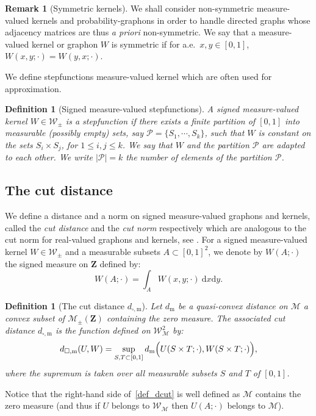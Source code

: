 \documentclass{amsart}
\newcommand{\aE}{a.e.\ }
\theoremstyle{plain}
\newtheorem{defin}[Th]{Definition}
\theoremstyle{definition}
\newtheorem{remark}[Th]{Remark}
\newcommand{\Space}{\mathbf{Z}}
\newcommand{\signed}{\pm}
\newcommand{\cm}{\mathcal{M}}
\newcommand{\cp}{\mathcal{P}}
\newcommand{\cM}{\mathcal{M}}
\newcommand{\cP}{\mathcal{P}}
\newcommand{\SignedMeas}{\mathcal{M}_{\pm}(\Space)}
\newcommand{\Kernel}{\mathcal{W}_{\signed}}
\newcommand{\KernelM}{\mathcal{W}_\cm}
\newcommand{\m}{\mathrm{m}}
\newcommand{\dmeas}{d_\m}
\newcommand{\dcut}{d_{\square,\m}}
\newcommand{\drv}{\mathrm{d}}
\begin{document}
\begin{remark}[Symmetric kernels]
We shall  consider non-symmetric measure-valued kernels and
probability-graphons in order to handle  directed graphs whose
adjacency matrices are thus \emph{a priori} non-symmetric.
We say that a measure-valued kernel or graphon $W$ is symmetric 
if for \aE $x,y \in [0,1]$, $W(x,y;\cdot)=W(y,x;\cdot)$.
\end{remark}

We define stepfunctions  measure-valued kernel which are  often used for
approximation.
 
\begin{defin}[Signed measure-valued stepfunctions]
  \label{def:stepfunction}
  A signed measure-valued kernel $W\in \Kernel$ is a \emph{stepfunction} if there exists a
  finite partition of $[0,1]$ into measurable (possibly empty) sets, say
  $\mathcal{P}=\{S_1,\cdots,S_k\}$, such that $W$ is constant on the sets
  $S_i \times  S_j$, for $1\leq i,j\leq  k$.  We say that  $W$ and the partition
  $\cP$  are \emph{adapted}  to each other.  
  We write  $|\cp|=k$ the  number of  elements of  the partition
  $\cp$.
 \end{defin}
  

\subsection{The cut distance}\label{section_def_dcut}

We define a distance and a  norm on signed measure-valued  graphons and kernels,
called  the \emph{cut  distance}  and the  \emph{cut norm}  respectively
which are analogous to the cut norm for real-valued graphons and
kernels, see  \cite[Chapter 8]{Lovasz}.
For a signed measure-valued kernel $W\in\Kernel$
and a measurable subsets $A\subset [0,1]^2$,
we denote by $W(A;\cdot)$  the signed measure on $\Space$ defined by:
\[
  W(A;\cdot) = \int_{A} W(x,y;\cdot)\ \drv x \drv y.
\]



\begin{defin}[The cut distance $\dcut$]
Let $\dmeas$ be a quasi-convex distance on $\cM$ a convex subset of
$\SignedMeas$ containing the zero measure. The associated \emph{cut
  distance} $\dcut$   is the
function  defined on $\KernelM^2$
by:
\begin{equation}
  \label{def_dcut}
\dcut(U,W) = \sup_{S,T\subset [0,1]} 
\dmeas \Bigl(U(S\times T;\cdot), W(S\times T;\cdot) \Bigr)  ,
\end{equation}
where the supremum is taken over all  measurable subsets $S$ and $T$ of $[0,1]$.
\end{defin}
Notice that the right-hand side of~\eqref{def_dcut} is well defined as $\cM$ contains the zero measure (and thus if $U$ belongs to $ \KernelM$ then $U(A; \cdot)$ belongs to $\cM$). 
\end{document}
